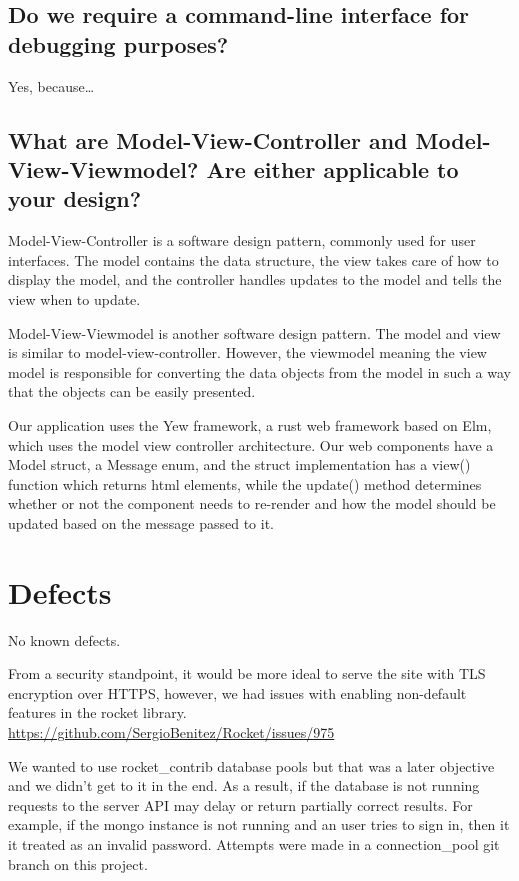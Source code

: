 \documentclass[letterpaper]{article}
\begin{document}
\subsection{Do we require a command-line interface for debugging purposes?}
Yes, because\dots

\subsection{What are Model-View-Controller and Model-View-Viewmodel? Are either applicable to your
design?}
Model-View-Controller is a software design pattern, commonly used for user interfaces.
The model contains the data structure, the view takes care of how to display the model,
and the controller handles updates to the model and tells the view when to update.

Model-View-Viewmodel is another software design pattern. The model and view is similar to model-view-controller.
However, the viewmodel meaning the view model is responsible for converting the data objects from the model in such
a way that the objects can be easily presented.

Our application uses the Yew framework, a rust web framework based on Elm, which uses the model
view controller architecture. Our web components have a Model struct, a Message enum, and the
struct implementation has a view() function which returns html elements, while the update()
method determines whether or not the component needs to re-render and how the model should be updated
based on the message passed to it.

\section{Defects}
No known defects.

From a security standpoint, it would be more ideal to serve the site with TLS encryption over HTTPS,
however, we had issues with enabling non-default features in the rocket library.
\url{https://github.com/SergioBenitez/Rocket/issues/975}

We wanted to use rocket\_contrib database pools but that was a later objective and we didn't get to it in the end. As a result, if the database is not running requests to the server API may delay or return partially correct results. For example, if the mongo instance is not running and an user tries to sign in, then it it treated as an invalid password. Attempts were made in a connection\_pool git branch on this project.
\end{document}
